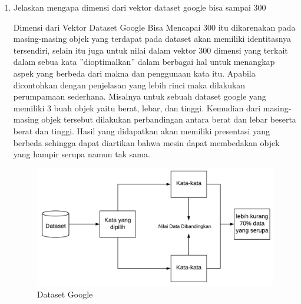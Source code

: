 \begin{enumerate}
			\item Jelaskan mengapa dimensi dari vektor dataset google bisa sampai 300
			\par Dimensi dari Vektor Dataset Google Bisa Mencapai 300 itu dikarenakan pada masing-masing objek yang terdapat pada dataset akan memiliki identitasnya tersendiri, selain itu juga untuk nilai dalam vektor 300 dimensi yang terkait dalam sebua kata ”dioptimalkan” dalam berbagai hal untuk menangkap aspek yang berbeda dari makna dan penggunaan kata itu. Apabila dicontohkan dengan penjelasan yang lebih rinci maka dilakukan perumpamaan sederhana. Misalnya untuk sebuah dataset google yang memiliki 3 buah objek yaitu berat, lebar, dan tinggi. Kemudian dari masing-masing objek tersebut dilakukan perbandingan antara berat dan lebar beserta berat dan tinggi. Hasil yang didapatkan akan memiliki presentasi yang berbeda sehingga dapat diartikan bahwa mesin dapat membedakan objek yang hampir serupa namun tak sama. 
			\begin{figure}[H]
				\centering
				\includegraphics[scale=0.4]{figures/1174057/chapter5/2.png}
				\caption{Dataset Google}
				\label{Dataset Google}
			\end{figure}


\end{enumerate}

